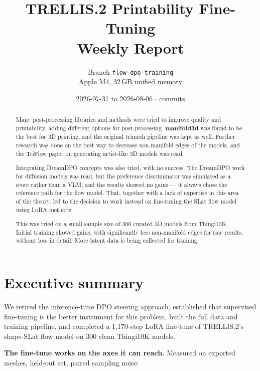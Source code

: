 \documentclass[11pt,a4paper]{article}
\title{\textbf{TRELLIS.2 Printability Fine-Tuning}\\[2pt]\large Weekly Report}
\author{Branch \texttt{flow-dpo-training}\\Apple M4, 32\,GB unified memory}
\date{2026-07-31 to 2026-08-06 \quad$\cdot$\quad 17 commits}
\begin{document}
\maketitle

\begin{abstract}
Many post-processing libraries and methods were tried to improve quality and printability, adding
different options for post-processing. \textbf{manifold3d} was found to be the best for 3D printing, and the
original trimesh pipeline was kept as well. Further research was done on the best way to decrease
non-manifold edges of the models, and the TriFlow paper on generating artist-like 3D models was read.

Integrating DreamDPO concepts was also tried, with no success. The DreamDPO work for diffusion
models was read, but the preference discriminator was simulated as a score rather than a VLM, and the
results showed no gains --- it always chose the reference path for the flow model. That, together with
a lack of expertise in this area of the theory, led to the decision to work instead on fine-tuning the
SLat flow model using LoRA methods.

This was tried on a small sample size of 300 curated 3D models from Thingi10K. Initial training
showed gains, with significantly less non-manifold edges for raw results, without loss in detail. More
latent data is being collected for training.

\end{abstract}
\section{Executive summary}
We retired the inference-time DPO steering approach, established that supervised fine-tuning is the
better instrument for this problem, built the full data and training pipeline, and completed a
1,170-step LoRA fine-tune of TRELLIS.2's shape-SLat flow model on 300 clean Thingi10K models.

\textbf{The fine-tune works on the axes it can reach.} Measured on exported meshes, held-out set,
paired sampling noise:
\end{document}
